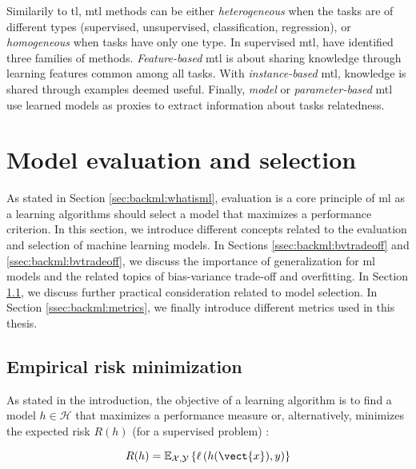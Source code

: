 Similarily to \acrlong{tl}, \acrlong{mtl} methods can be either \textit{heterogeneous}
when the tasks are of different types (\eg supervised, unsupervised, classification,
regression), or \textit{homogeneous} when tasks have only one type. In supervised
\acrlong{mtl}, \parencite{zhang2017survey} have identified three families of
methods. \textit{Feature-based} \acrlong{mtl} is about sharing knowledge through
learning features common among all tasks. With \textit{instance-based} \acrlong{mtl},
knowledge is shared through examples deemed useful. Finally, \textit{model} or
\textit{parameter-based} \acrlong{mtl} use learned models as proxies to extract
information about tasks relatedness.


\section{Model evaluation and selection}
\label{sec:backml:modeleval}

As stated in Section \ref{sec:backml:whatisml}, evaluation is a core principle of
\acrlong{ml} as a learning algorithms should select a model that maximizes a
performance criterion. In this section, we introduce different concepts related
to the evaluation and selection of machine learning models. In Sections
\ref{ssec:backml:bvtradeoff} and \ref{ssec:backml:bvtradeoff}, we discuss the
importance of generalization for \acrlong{ml} models and the related topics of
bias-variance trade-off and overfitting. In Section \ref{ssec:backml:modelselection},
we discuss further practical consideration related to model selection. In Section
\ref{ssec:backml:metrics}, we finally introduce different metrics used in this
thesis.


\subsection{Empirical risk minimization}
\label{ssec:backml:modelselection}
As stated in the introduction, the objective of a learning algorithm is to find
a model $h \in \mathcal{H}$ that maximizes a performance measure or, alternatively,
minimizes the expected risk $R(h)$ (for a supervised problem)
\parencite{vapnik1992principles}:

\begin{equation}
\label{eqn:backml:expriskmin}
R(h) = \mathbb{E}_{\mathcal{X},\mathcal{Y}}\left\{\ell\left(h(\vect{x}), y\right)\right\}
\end{equation}

